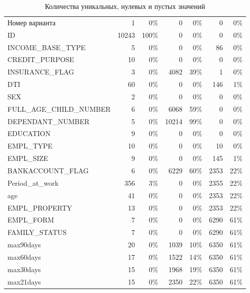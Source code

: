 \documentclass[12pt,a4paper]{article}
\begin{document}
\begin{longtable}{l|rr|rr|rr}
    \bottomrule
    \caption{Количества уникальных, нулевых и пустых значений}\label{table:nans}
    \endlastfoot
    Номер варианта           & 1     &   0\% & 0     &  0\% & 0    & 0\%  \\
    ID                       & 10243 & 100\% & 0     &  0\% & 0    & 0\%  \\
    INCOME\_BASE\_TYPE       & 5     &   0\% & 0     &  0\% & 86   & 0\%  \\
    CREDIT\_PURPOSE          & 10    &   0\% & 0     &  0\% & 0    & 0\%  \\
    INSURANCE\_FLAG          & 3     &   0\% & 4082  & 39\% & 1    & 0\%  \\
    DTI                      & 60    &   0\% & 0     &  0\% & 146  & 1\%  \\
    SEX                      & 2     &   0\% & 0     &  0\% & 0    & 0\%  \\
    FULL\_AGE\_CHILD\_NUMBER & 6     &   0\% & 6068  & 59\% & 0    & 0\%  \\
    DEPENDANT\_NUMBER        & 5     &   0\% & 10214 & 99\% & 0    & 0\%  \\
    EDUCATION                & 9     &   0\% & 0     &  0\% & 0    & 0\%  \\
    EMPL\_TYPE               & 10    &   0\% & 0     &  0\% & 10   & 0\%  \\
    EMPL\_SIZE               & 9     &   0\% & 0     &  0\% & 145  & 1\%  \\
    BANKACCOUNT\_FLAG        & 6     &   0\% & 6229  & 60\% & 2353 & 22\% \\
    Period\_at\_work         & 356   &   3\% & 0     &  0\% & 2355 & 22\% \\
    age                      & 41    &   0\% & 0     &  0\% & 2353 & 22\% \\
    EMPL\_PROPERTY           & 13    &   0\% & 0     &  0\% & 2353 & 22\% \\
    EMPL\_FORM               & 7     &   0\% & 0     &  0\% & 6290 & 61\% \\
    FAMILY\_STATUS           & 7     &   0\% & 0     &  0\% & 6290 & 61\% \\
    max90days                & 20    &   0\% & 1039  & 10\% & 6350 & 61\% \\
    max60days                & 17    &   0\% & 1522  & 14\% & 6350 & 61\% \\
    max30days                & 15    &   0\% & 1968  & 19\% & 6350 & 61\% \\
    max21days                & 15    &   0\% & 2350  & 22\% & 6350 & 61\% \\

\end{longtable}
\end{document}
